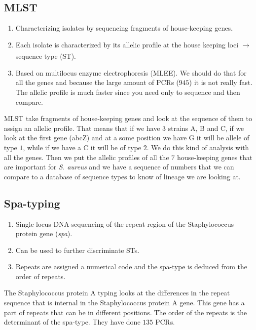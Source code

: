 \subsection{MLST}

\begin{enumerate}
    \item Characterizing isolates by sequencing fragments of house-keeping genes. 
    \item Each isolate is characterized by its allelic profile at the house keeping loci $\xrightarrow[]{}$ sequence type (ST). 
    \item Based on multilocus enzyme electrophoresis (MLEE). We should do that for all the genes and because the large amount of PCRs ($945$) it is not really fast. The allelic profile is much faster since you need only to sequence and then compare. 
\end{enumerate}

MLST take fragments of house-keeping genes and look at the sequence of them to assign an allelic profile. That means that if we have $3$ strains A, B and C, if we look at the first gene (abcZ) and at a some position we have G it will be allele of type $1$, while if we have a C it will be of type $2$. We do this kind of analysis with all the genes. Then we put the allelic profiles of all the $7$ house-keeping genes that are important for \emph{S. aureus} and we have a sequence of numbers that we can compare to a database of sequence types to know of lineage we are looking at. 

\subsection{Spa-typing}

\begin{enumerate}
    \item Single locus DNA-sequencing of the repeat region of the Staphylococcus protein gene (\emph{spa}).
    \item Can be used to further discriminate STs. 
    \item Repeats are assigned a numerical code and the spa-type is deduced from the order of repeats. 
\end{enumerate}

The Staphylococcus protein A typing looks at the differences in the repeat sequence that is internal in the Staphylococcus protein A gene. This gene has a part of repeats that can be in different positions. The order of the repeats is the determinant of the spa-type. 
They have done $135$ PCRs.

